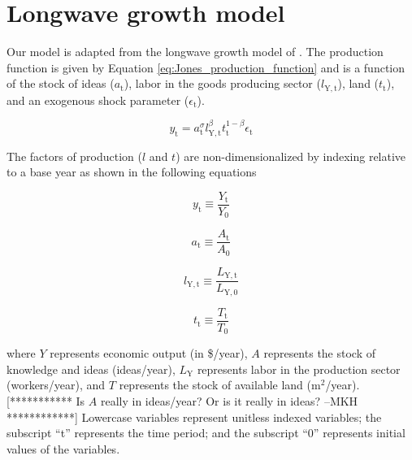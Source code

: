 \documentclass[letterpaper,12pt]{article}
\begin{document}

\section{Longwave growth model}
Our model is adapted from the longwave growth model of \citet{Jones2001}. The production function is given by Equation \ref{eq:Jones_production_function} and is a function of the stock of ideas ($a_\mathrm{t}$), labor in the goods producing sector ($l_\mathrm{Y,t}$), land ($t_\mathrm{t}$), and an exogenous shock parameter ($\epsilon_\mathrm{t}$).

\begin{equation} \label{eq:Jones_production_function}
	y_\mathrm{t} = a_\mathrm{t} ^\sigma l_\mathrm{Y,t} ^\beta t_\mathrm{t} ^{1-\beta} \epsilon_\mathrm{t}
\end{equation}

The factors of production ($l$ and $t$) are non-dimensionalized by indexing relative to a base year as shown in the following equations

\begin{equation} \label{eq:index_y}
	y_\mathrm{t} \equiv \frac{Y_\mathrm{t}}{Y_\mathrm{0}}
\end{equation}

\begin{equation} \label{eq:index_a}
	a_\mathrm{t} \equiv \frac{A_\mathrm{t}}{A_\mathrm{0}}
\end{equation}

\begin{equation} \label{eq:index_l}
	l_\mathrm{Y,t} \equiv \frac{L_\mathrm{Y,t}}{L_\mathrm{Y,0}}
\end{equation}

\begin{equation} \label{eq:index_t}
	t_\mathrm{t} \equiv \frac{T_\mathrm{t}}{T_\mathrm{0}}
\end{equation}

\noindent where $Y$ represents economic output (in \$/year), $A$ represents the stock of knowledge and ideas (ideas/year), $L_\mathrm{Y}$ represents labor in the production sector (workers/year), and $T$ represents the stock of available land ($\mathrm{m}^2$/year). [*********** Is $A$ really in ideas/year? Or is it really in ideas? --MKH ************] Lowercase variables represent unitless indexed variables; the subscript ``t'' represents the time period; and the subscript ``0'' represents initial values of the variables.
\end{document}
